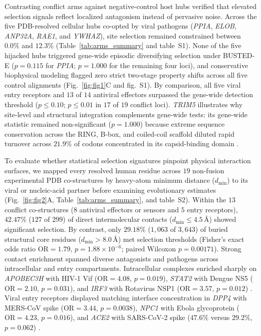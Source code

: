 \documentclass[12pt]{article}
\begin{document}
Contrasting conflict arms against negative-control host hubs verified that elevated selection signals reflect localized antagonism instead of pervasive noise. Across the five PDB-resolved cellular hubs co-opted by viral pathogens (\textit{PPIA}, \textit{ELOB}, \textit{ANP32A}, \textit{RAE1}, and \textit{YWHAZ}), site selection remained constrained between $0.0\%$ and $12.3\%$ (Table~\ref{tab:arms_summary} and table~S1). None of the five hijacked hubs triggered gene-wide episodic diversifying selection under BUSTED-E ($p = 0.115$ for \textit{PPIA}; $p = 1.000$ for the remaining four loci), and conservative biophysical modeling flagged zero strict two-stage property shifts across all five control alignments (Fig.~\ref{fig:fig1}C and fig.~S1). By comparison, all five viral entry receptors and $13$ of $14$ antiviral effectors surpassed the gene-wide detection threshold ($p \le 0.10$; $p \le 0.01$ in $17$ of $19$ conflict loci). \textit{TRIM5} illustrates why site-level and structural integration complements gene-wide tests: its gene-wide statistic remained non-significant ($p = 1.000$) because extreme sequence conservation across the RING, B-box, and coiled-coil scaffold diluted rapid turnover across $21.9\%$ of codons concentrated in its capsid-binding domain \cite{sawyer2005positive,tenthorey2020mutational}.

To evaluate whether statistical selection signatures pinpoint physical interaction surfaces, we mapped every resolved human residue across $19$ non-fusion experimental PDB co-structures by heavy-atom minimum distance ($d_{\min}$) to its viral or nucleic-acid partner before examining evolutionary estimates (Fig.~\ref{fig:fig2}A, Table~\ref{tab:arms_summary}, and table~S2). Within the $13$ conflict co-structures ($8$ antiviral effectors or sensors and $5$ entry receptors), $42.47\%$ ($127$ of $299$) of direct intermolecular contacts ($d_{\min} \le 4.5$\,\AA) showed significant selection. By contrast, only $29.18\%$ ($1,063$ of $3,643$) of buried structural core residues ($d_{\min} > 8.0$\,\AA) met selection thresholds (Fisher's exact odds ratio $\mathrm{OR} = 1.79$, $p = 1.88 \times 10^{-6}$; paired Wilcoxon $p = 0.00171$). Strong contact enrichment spanned diverse antagonists and pathogens across intracellular and entry compartments. Intracellular complexes enriched sharply on \textit{APOBEC3H} with HIV-1 Vif ($\mathrm{OR} = 4.08$, $p = 0.019$), \textit{STAT2} with Dengue NS5 ($\mathrm{OR} = 2.10$, $p = 0.031$), and \textit{IRF3} with Rotavirus NSP1 ($\mathrm{OR} = 3.57$, $p = 0.012$) \cite{ito2023a3h,biswal2024stat2,zhao2016irf3}. Viral entry receptors displayed matching interface concentration in \textit{DPP4} with MERS-CoV spike ($\mathrm{OR} = 3.44$, $p = 0.0038$), \textit{NPC1} with Ebola glycoprotein ($\mathrm{OR} = 4.23$, $p = 0.016$), and \textit{ACE2} with SARS-CoV-2 spike ($47.6\%$ versus $29.2\%$, $p = 0.062$) \cite{wang2013dpp4,wang2016npc1,lan2020structure}.
\end{document}
